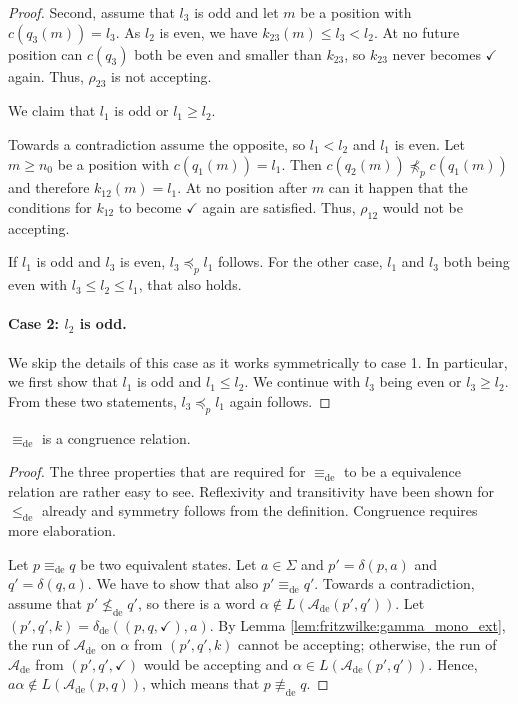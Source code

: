 \begin{proof}
	Second, assume that $l_3$ is odd and let $m$ be a position with $c(q_3(m)) = l_3$. As $l_2$ is even, we have $k_{23}(m) \leq l_3 < l_2$. At no future position can $c(q_3)$ both be even and smaller than $k_{23}$, so $k_{23}$ never becomes $\checkmark$ again. Thus, $\rho_{23}$ is not accepting.
	
	We claim that $l_1$ is odd or $l_1 \geq l_2$.
	
	Towards a contradiction assume the opposite, so $l_1 < l_2$ and $l_1$ is even. Let $m \geq n_0$ be a position with $c(q_1(m)) = l_1$. Then $c(q_2(m)) \not\preceq_p c(q_1(m))$ and therefore $k_{12}(m) = l_1$. At no position after $m$ can it happen that the conditions for $k_{12}$ to become $\checkmark$ again are satisfied. Thus, $\rho_{12}$ would not be accepting.
	
	If $l_1$ is odd and $l_3$ is even, $l_3 \preceq_p l_1$ follows. For the other case, $l_1$ and $l_3$ both being even with $l_3 \leq l_2 \leq l_1$, that also holds.
	
	\paragraph{Case 2: $l_2$ is odd.} We skip the details of this case as it works symmetrically to case 1. In particular, we first show that $l_1$ is odd and $l_1 \leq l_2$. We continue with $l_3$ being even or $l_3 \geq l_2$. From these two statements, $l_3 \preceq_p l_1$ again follows.
\end{proof}

\begin{theorem}
	$\equiv_\text{de}$ is a congruence relation.
\end{theorem}

\begin{proof}
	The three properties that are required for $\equiv_\text{de}$ to be a equivalence relation are rather easy to see. Reflexivity and transitivity have been shown for $\leq_\text{de}$ already and symmetry follows from the definition. Congruence requires more elaboration.

	Let $p \equiv_\text{de} q$ be two equivalent states. Let $a \in \Sigma$ and $p' = \delta(p, a)$ and $q' = \delta(q, a)$. We have to show that also $p' \equiv_\text{de} q'$. Towards a contradiction, assume that $p' \not\leq_\text{de} q'$, so there is a word $\alpha \notin L(\mathcal{A}_\text{de}(p', q'))$. Let $(p', q', k) = \delta_\text{de}((p, q, \checkmark), a)$. By Lemma \ref{lem:fritzwilke:gamma_mono_ext}, the run of $\mathcal{A}_\text{de}$ on $\alpha$ from $(p', q', k)$ cannot be accepting; otherwise, the run of $\mathcal{A}_\text{de}$ from $(p', q', \checkmark)$ would be accepting and $\alpha \in L(\mathcal{A}_\text{de}(p', q'))$. Hence, $a \alpha \notin L(\mathcal{A}_\text{de}(p, q))$, which means that $p \not\equiv_\text{de} q$.
\end{proof}

